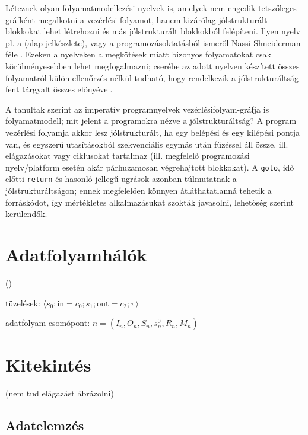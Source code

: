 Léteznek olyan folyamatmodellezési nyelvek is, amelyek nem engedik tetszőleges gráfként megalkotni a vezérlési folyamot, hanem kizárólag jólstrukturált blokkokat lehet létrehozni és más jólstrukturált blokkokból felépíteni. Ilyen nyelv pl. a  (alap jelkészlete), vagy a programozásoktatásból ismeről Nassi-Shneiderman-féle . Ezeken a nyelveken a megkötések miatt bizonyos folyamatokat csak körülményesebben lehet megfogalmazni; cserébe az adott nyelven készített összes folyamatról külön ellenőrzés nélkül tudható, hogy rendelkezik a jólstrukturáltság fent tárgyalt összes előnyével.

A tanultak szerint az imperatív programnyelvek vezérlésifolyam-gráfja is folyamatmodell; mit jelent a programokra nézve a jólstrukturáltság? A program vezérlési folyamja akkor lesz jólstrukturált, ha egy belépési és egy kilépési pontja van, és egyszerű utasításokból szekvenciális egymás után fűzéssel áll össze, ill. elágazásokat vagy ciklusokat tartalmaz (ill. megfelelő programozási nyelv/platform esetén akár párhuzamosan végrehajtott blokkokat). A \lstinline{goto}, idő előtti \lstinline{return} és hasonló jellegű ugrások azonban túlmutatnak a jólstrukturáltságon; ennek megfelelően könnyen átláthatatlanná tehetik a forráskódot, így mértékletes alkalmazásukat szokták javasolni, lehetőség szerint kerülendők.

\section{Adatfolyamhálók}

 


 ()

\newcommand{\prioritas}{\pi}
\newcommand{\tuple}[1]{\langle #1 \rangle}

tüzelések: $\tuple{s_0; \mathrm{in} = c_0; s_1; \mathrm{out} = c_2; \prioritas}$

adatfolyam csomópont: $n = (I_n, O_n, S_n, s_n^0, R_n, M_n)$

\section{Kitekintés\kieg}


 (nem tud elágazást ábrázolni)

\subsection{Adatelemzés}

